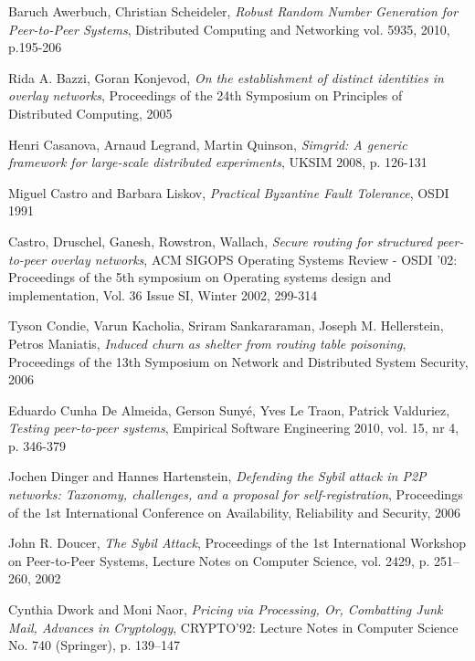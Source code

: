 \begin{thebibliography}{99}

  Baruch Awerbuch, Christian Scheideler,
  \textit{Robust Random Number Generation for Peer-to-Peer Systems},
  Distributed Computing and Networking vol. 5935, 2010, p.195-206

  Rida A. Bazzi, Goran Konjevod,
  \textit{On the establishment of distinct identities in overlay networks},
  Proceedings of the 24th Symposium on Principles of Distributed Computing,
  2005


  Henri Casanova, Arnaud Legrand, Martin Quinson,
  \textit{Simgrid: A generic framework for large-scale distributed experiments},
  UKSIM 2008, p. 126-131

  Miguel Castro and Barbara Liskov,
  \textit{Practical Byzantine Fault Tolerance},
  OSDI 1991


 Castro, Druschel, Ganesh, Rowstron, Wallach,
  \textit{Secure routing for structured peer-to-peer overlay networks},
  ACM SIGOPS Operating Systems Review - OSDI '02: Proceedings of the 5th
  symposium on Operating systems design and implementation,
  Vol. 36 Issue SI, Winter 2002,
  299-314

  Tyson Condie, Varun Kacholia, Sriram Sankararaman, Joseph M. Hellerstein,
  Petros Maniatis,
  \textit{Induced churn as shelter from routing table poisoning},
  Proceedings of the 13th Symposium on Network and Distributed System Security,
  2006

  Eduardo Cunha De Almeida, Gerson Suny{\'e}, Yves Le Traon, Patrick Valduriez,
  \textit{Testing peer-to-peer systems},
  Empirical Software Engineering 2010, vol. 15, nr 4, p. 346-379
 
  Jochen Dinger and Hannes Hartenstein,
  \textit{Defending the Sybil attack in P2P networks: Taxonomy, challenges, and
  a proposal for self-registration},
  Proceedings of the 1st International Conference on Availability, Reliability
  and Security,
  2006

 John R. Doucer,
  \textit{The Sybil Attack},
  Proceedings of the 1st International Workshop on Peer-to-Peer Systems,
  Lecture Notes on Computer Science, vol.  2429, p. 251--260,
  2002

  Cynthia Dwork and Moni Naor,
  \textit{Pricing via Processing, Or, Combatting Junk Mail, Advances in
  Cryptology},
  CRYPTO’92: Lecture Notes in Computer Science No. 740 (Springer),
  p. 139--147




\end{thebibliography}
